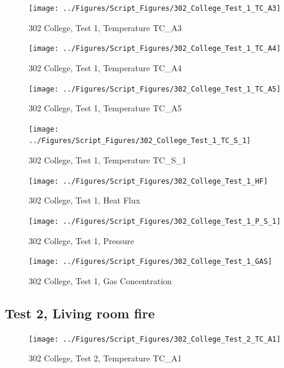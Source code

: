 \documentclass[12pt,oneside]{book}
\begin{document}
\begin{figure}[!ht]
\texttt{[image: ../Figures/Script\_Figures/302\_College\_Test\_1\_TC\_A3]}
\caption{302 College, Test 1, Temperature TC\_A3}
\label{fig:302_College_Test_1_TC_A3}
\end{figure}

\begin{figure}[!ht]
\texttt{[image: ../Figures/Script\_Figures/302\_College\_Test\_1\_TC\_A4]}
\caption{302 College, Test 1, Temperature TC\_A4}
\label{fig:302_College_Test_1_TC_A4}
\end{figure}

\begin{figure}[!ht]
\texttt{[image: ../Figures/Script\_Figures/302\_College\_Test\_1\_TC\_A5]}
\caption{302 College, Test 1, Temperature TC\_A5}
\label{fig:302_College_Test_1_TC_A5}
\end{figure}

\begin{figure}[!ht]
\texttt{[image: ../Figures/Script\_Figures/302\_College\_Test\_1\_TC\_S\_1]}
\caption{302 College, Test 1, Temperature TC\_S\_1}
\label{fig:302_College_Test_1_TC_S_1}
\end{figure}

\begin{figure}[!ht]
\texttt{[image: ../Figures/Script\_Figures/302\_College\_Test\_1\_HF]}
\caption{302 College, Test 1, Heat Flux}
\label{fig:302_College_Test_1_HF}
\end{figure}

\begin{figure}[!ht]
\texttt{[image: ../Figures/Script\_Figures/302\_College\_Test\_1\_P\_S\_1]}
\caption{302 College, Test 1, Pressure}
\label{fig:302_College_Test_1_P_S_1}
\end{figure}

\begin{figure}[!ht]
\texttt{[image: ../Figures/Script\_Figures/302\_College\_Test\_1\_GAS]}
\caption{302 College, Test 1, Gas Concentration}
\label{fig:302_College_Test_1_GAS}
\end{figure}


\clearpage


\subsection{Test 2, Living room fire}

\begin{figure}[!ht]
\texttt{[image: ../Figures/Script\_Figures/302\_College\_Test\_2\_TC\_A1]}
\caption{302 College, Test 2, Temperature TC\_A1}
\label{fig:302_College_Test_2_TC_A1}
\end{figure}
\end{document}
